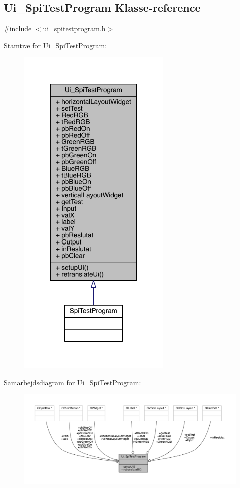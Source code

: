 \hypertarget{class_ui___spi_test_program}{}\subsection{Ui\+\_\+\+Spi\+Test\+Program Klasse-\/reference}
\label{class_ui___spi_test_program}


{\ttfamily \#include $<$ui\+\_\+spitestprogram.\+h$>$}



Stamtræ for Ui\+\_\+\+Spi\+Test\+Program\+:
\nopagebreak
\begin{figure}[H]
\begin{center}
\leavevmode
\includegraphics[width=209pt]{class_ui___spi_test_program__inherit__graph}
\end{center}
\end{figure}


Samarbejdsdiagram for Ui\+\_\+\+Spi\+Test\+Program\+:
\nopagebreak
\begin{figure}[H]
\begin{center}
\leavevmode
\includegraphics[width=350pt]{class_ui___spi_test_program__coll__graph}
\end{center}
\end{figure}
